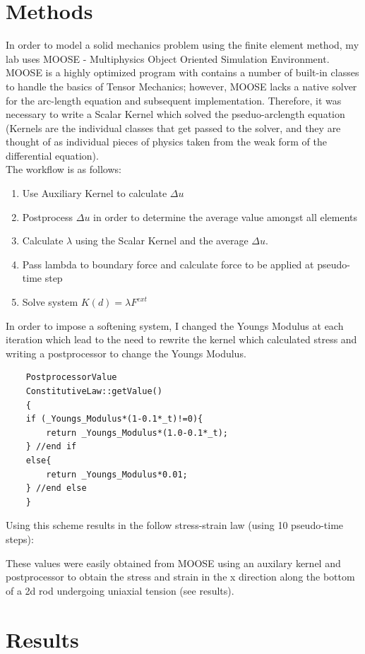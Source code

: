 \documentclass[10pt,a4paper]{article}
\begin{document}
	\section{Methods}
	In order to model a solid mechanics problem using the finite element method, my lab uses MOOSE - Multiphysics Object Oriented Simulation Environment. MOOSE is a highly optimized program with contains a number of built-in classes to handle the basics of Tensor Mechanics; however, MOOSE lacks a native solver for the arc-length equation and subsequent implementation. Therefore, it was necessary to write a Scalar Kernel which solved the pseduo-arclength equation (Kernels are the individual classes that get passed to the solver, and they are thought of as individual pieces of physics taken from the weak form of the differential equation).\\
	 The workflow is as follows:
	 \begin{enumerate}
	 	\item Use Auxiliary Kernel to calculate $\Delta u$
	 	\item Postprocess $\Delta u$ in order to determine the average value amongst all elements
	 	\item Calculate $\lambda$ using the Scalar Kernel and the average $\Delta u$.
	 	\item Pass lambda to boundary force and calculate force to be applied at pseudo-time step
	 	\item Solve system $K(d)=\lambda F^{ext} $
	 \end{enumerate}
	In order to impose a softening system, I changed the Youngs Modulus at each iteration which lead to the need to rewrite the kernel which calculated stress and writing a postprocessor to change the Youngs Modulus. 
	\begin{lstlisting}
	PostprocessorValue
	ConstitutiveLaw::getValue()
	{
	if (_Youngs_Modulus*(1-0.1*_t)!=0){
		return _Youngs_Modulus*(1.0-0.1*_t);
	} //end if
	else{
		return _Youngs_Modulus*0.01;
	} //end else
	}
	\end{lstlisting}
	Using this scheme results in the follow stress-strain law (using 10 pseudo-time steps):

	These values were easily obtained from MOOSE using an auxilary kernel and postprocessor to obtain the stress and strain in the x direction along the bottom of a 2d rod undergoing uniaxial tension (see results).
	\newpage
	\section{Results}
	
\end{document}
